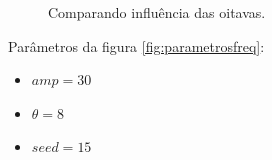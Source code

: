 \begin{figure}[H]
     \centering
     \hspace{0.1cm}
     \hspace{0.1cm}
     \caption{Comparando influência das oitavas.}
     \label{fig:parametrosOctaves}
\end{figure}

Parâmetros da figura \ref{fig:parametrosfreq}:
\begin{itemize}
    \item $amp = 30$
    \item $\theta = 8$
    \item $seed = 15$
\end{itemize}

